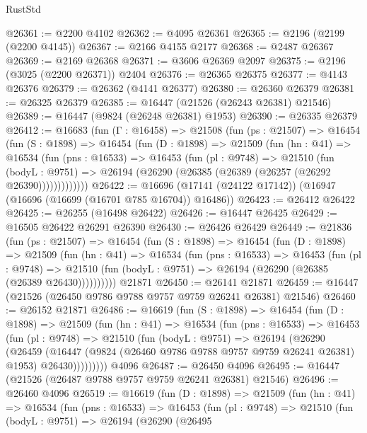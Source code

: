 \begin{lexlean}{RustStd}
\begin{coremodule}
@26361 := @2200 @4102
@26362 := @4095 @26361
@26365 := @2196 (@2199 (@2200 @4145))
@26367 := @2166 @4155 @2177
@26368 := @2487 @26367
@26369 := @2169 @26368
@26371 := @3606 @26369 @2097
@26375 := @2196 (@3025 (@2200 @26371)) @2404
@26376 := @26365 @26375
@26377 := @4143 @26376
@26379 := @26362 (@4141 @26377)
@26380 := @26360 @26379
@26381 := @26325 @26379
@26385 := @16447 (@21526 (@26243 @26381) @21546)
@26389 := @16447 (@9824 (@26248 @26381) @1953)
@26390 := @26335 @26379
@26412 := @16683
    (fun (Γ : @16458) =>
    @21508
      (fun (ps : @21507) =>
      @16454
        (fun (S : @1898) =>
        @16454
          (fun (D : @1898) =>
          @21509
            (fun (hn : @41) =>
            @16534
              (fun (pns : @16533) =>
              @16453
                (fun (pl : @9748) =>
                @21510
                  (fun (bodyL : @9751) =>
                  @26194 (@26290 (@26385 (@26389 (@26257 (@26292 @26390)))))))))))))
@26422 := @16696 (@17141 (@24122 @17142)) (@16947 (@16696 (@16699 (@16701 @785 @16704)) @16486))
@26423 := @26412 @26422
@26425 := @26255 (@16498 @26422)
@26426 := @16447 @26425
@26429 := @16505 @26422 @26291 @26390
@26430 := @26426 @26429
@26449 := @21836
    (fun (ps : @21507) =>
    @16454
      (fun (S : @1898) =>
      @16454
        (fun (D : @1898) =>
        @21509
          (fun (hn : @41) =>
          @16534
            (fun (pns : @16533) =>
            @16453
              (fun (pl : @9748) =>
              @21510 (fun (bodyL : @9751) => @26194 (@26290 (@26385 (@26389 @26430))))))))))
    @21871
@26450 := @26141 @21871
@26459 := @16447 (@21526 (@26450 @9786 @9788 @9757 @9759 @26241 @26381) @21546)
@26460 := @26152 @21871
@26486 := @16619
    (fun (S : @1898) =>
    @16454
      (fun (D : @1898) =>
      @21509
        (fun (hn : @41) =>
        @16534
          (fun (pns : @16533) =>
          @16453
            (fun (pl : @9748) =>
            @21510
              (fun (bodyL : @9751) =>
              @26194
                (@26290
                  (@26459
                    (@16447
                      (@9824 (@26460 @9786 @9788 @9757 @9759 @26241 @26381) @1953)
                      @26430)))))))))
    @4096
@26487 := @26450 @4096
@26495 := @16447 (@21526 (@26487 @9788 @9757 @9759 @26241 @26381) @21546)
@26496 := @26460 @4096
@26519 := @16619
    (fun (D : @1898) =>
    @21509
      (fun (hn : @41) =>
      @16534
        (fun (pns : @16533) =>
        @16453
          (fun (pl : @9748) =>
          @21510
            (fun (bodyL : @9751) =>
            @26194
              (@26290
                (@26495

\end{coremodule}
\end{lexlean}
